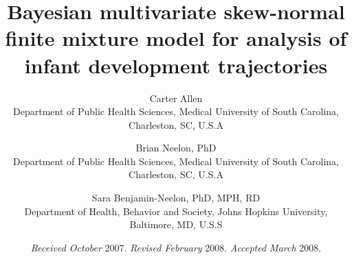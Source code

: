 \documentclass[useAMS,referee]{biom}
\title[]{Bayesian multivariate skew-normal finite mixture model for analysis of infant development trajectories}
\author
{Carter Allen\emailx{allecart@musc.edu} \\
Department of Public Health Sciences, Medical University of South Carolina, Charleston, SC, U.S.A
\and
Brian Neelon, PhD \\
Department of Public Health Sciences, Medical University of South Carolina, Charleston, SC, U.S.A
\and
Sara Benjamin-Neelon, PhD, MPH, RD \\
Department of Health, Behavior and Society, Johns Hopkins University, Baltimore, MD, U.S.S}
\begin{document}

\date{{\it Received October} 2007. {\it Revised February} 2008.  {\it
Accepted March} 2008.}



\pagerange{\pageref{firstpage}--\pageref{lastpage}} 




\label{firstpage}

\end{document}
